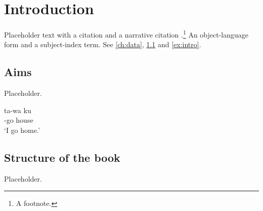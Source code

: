\chapter{Introduction}\label{ch:intro}

Placeholder text with a citation \parencite[514--515]{murray-vennemann1983} and a
narrative citation \textcite[238]{mccarthy-prince1999}.\footnote{A footnote.}
An object-language form   and a
subject-index term. See \cref{ch:data}, \cref{sec:intro-aims}
and \cref{ex:intro}.

\section{Aims}\label{sec:intro-aims}
Placeholder.

\ea\label{ex:intro}
  \gll ta-wa ku\\
       \Fsg-go house\\
  \glt `I go home.' 
\z

\section{Structure of the book}
Placeholder.
